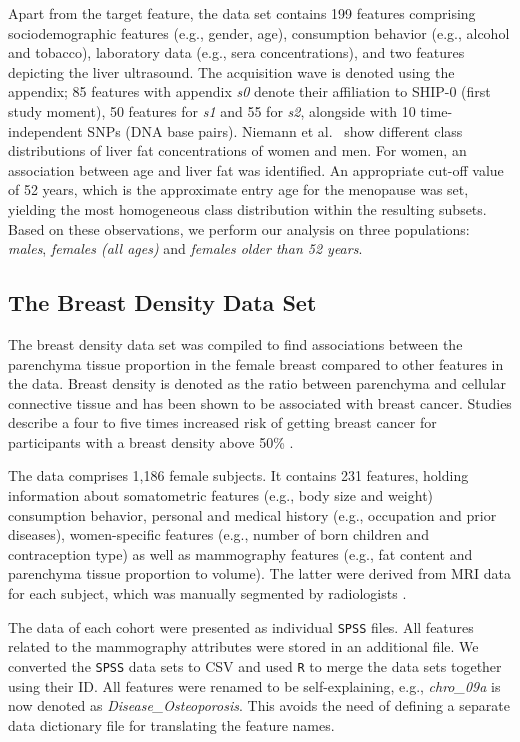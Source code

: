 \documentclass[journal]{style/vgtc} 			          %
\begin{document}
Apart from the target feature, the data set contains 199 features comprising sociodemographic features (e.g., gender, age), consumption behavior (e.g., alcohol and tobacco), laboratory data (e.g., sera concentrations), and two features depicting the liver ultrasound.
The acquisition wave is denoted using the appendix; 85 features with appendix \emph{s0} denote their affiliation to SHIP-0 (first study moment), 50 features for \emph{s1} and 55 for \emph{s2}, alongside with 10 time-independent SNPs (DNA base pairs).
Niemann et al.~\cite{Niemann2014} show different class distributions of liver fat concentrations of women and men.
For women, an association between age and liver fat was identified.
An appropriate cut-off value of 52 years, which is the approximate entry age for the menopause was set, yielding the most homogeneous class distribution within the resulting subsets.
Based on these observations, we perform our analysis on three populations: \emph{males}, \emph{females (all ages)} and \emph{females older than 52 years}.
\subsection{The Breast Density Data Set}
The breast density data set was compiled to find associations between the parenchyma tissue proportion in the female breast compared to other features in the data.
Breast density is denoted as the ratio between parenchyma and cellular connective tissue and has been shown to be associated with breast cancer.
Studies describe a four to five times increased risk of getting breast cancer for participants with a breast density above 50\% \cite{Mccormack2006}.

The data comprises 1,186 female subjects. %
It contains 231 features, holding information about somatometric features (e.g., body size and weight) consumption behavior, personal and medical history (e.g., occupation and prior diseases), women-specific features (e.g., number of born children and contraception type) as well as mammography features (e.g., fat content and parenchyma tissue proportion to volume).
The latter were derived from MRI data for each subject, which was manually segmented by radiologists \cite{Hegenscheid2009, Ivanovska2014}.

The data of each cohort were presented as individual \texttt{SPSS} files.
All features related to the mammography attributes were stored in an additional file.
We converted the \texttt{SPSS} data sets to CSV and used \texttt{R} to merge the data sets together using their ID.
All features were renamed to be self-explaining, e.g., \emph{chro\_09a} is now denoted as \emph{Disease\_Osteoporosis}.
This avoids the need of defining a separate data dictionary file for translating the feature names.
\end{document}

